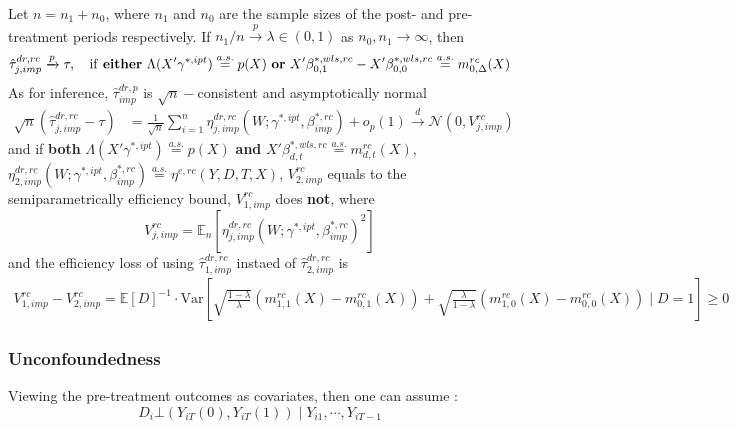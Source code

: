 \documentclass[twoside]{article}
\begin{document}
\begin{itemize}
    Let $n=n_1+n_0$, where $n_1$ and $n_0$ are the sample sizes of the post- and pre-treatment periods respectively. If $n_1/n\xrightarrow{p}\lambda\in(0,1)$ as $n_0,n_1\rightarrow\infty$, then
    $$
    \hat{\tau}^{dr,rc}_{j,imp} \xrightarrow{p} \tau,\ \  \text{ if \textbf{either} $\Lambda(X'\gamma^{*,ipt})\overset{a.s.}{=}p(X)$ \textbf{or} $X'\beta^{*,wls,rc}_{0,1}-X'\beta^{*,wls,rc}_{0,0}\overset{a.s.}{=}m^{rc}_{0,\Delta}(X)$}
    $$
    As for inference, $\hat{\tau}^{dr,p}_{imp}$ is $\sqrt{n}-$consistent and asymptotically normal
    \begin{align*}
        \sqrt{n}\left(\hat{\tau}^{dr,rc}_{j,imp}-\tau\right) &= \frac{1}{\sqrt{n}} \sum^n_{i=1}\eta^{dr,rc}_{j,imp} \left(W; \gamma^{*,ipt},\beta^{*,rc}_{imp}\right) + o_p(1) \xrightarrow{d} \mathcal{N}\left(0,V^{rc}_{j,imp}\right)
    \end{align*}
    and if \textbf{both}  $\Lambda(X'\gamma^{*,ipt})\overset{a.s.}{=}p(X)$ \textbf{and} $X'\beta^{*,wls,rc}_{d,t}\overset{a.s.}{=}m^{rc}_{d,t}(X)$, $\eta^{dr,rc}_{2,imp}\left(W;\gamma^{*,ipt},\beta^{*,rc}_{imp}\right) \overset{a.s.}{=} \eta^{e,rc}\left(Y,D,T,X\right)$, $V^{rc}_{2,imp}$ equals to the semiparametrically efficiency bound, $V^{rc}_{1,imp}$ does \textbf{not}, where
    \begin{equation*}
        {V}^{rc}_{j,imp} = \mathbb{E}_n\left[\eta^{dr,rc}_{j,imp}\left(W;\gamma^{*,ipt},\beta^{*,rc}_{imp}\right)^2\right]
    \end{equation*}
    and the efficiency loss of using $\hat{\tau}^{dr,rc}_{1,imp}$ instaed of $\hat{\tau}^{dr,rc}_{2,imp}$ is 
    \begin{align*}
        V^{rc}_{1,imp} - V^{rc}_{2,imp} = \mathbb{E} [D]^{-1} \cdot \mathrm{Var} \left[ \sqrt{\frac{1-\lambda}{\lambda}} \left(m^{rc}_{1,1}(X)-m^{rc}_{0,1}(X)\right) + \sqrt{\frac{\lambda}{1-\lambda}} \left(m^{rc}_{1,0}(X)-m^{rc}_{0,0}(X)\right) \mid D=1\right]\geq 0
    \end{align*}
\end{itemize}

\subsubsection{Unconfoundedness}

Viewing the pre-treatment outcomes as covariates, then one can assume :
\begin{equation*}
    D_i \bot \left(Y_{iT}(0),Y_{iT}(1)\right) \mid Y_{i1},\cdots,Y_{iT-1}
\end{equation*}
\end{document}
